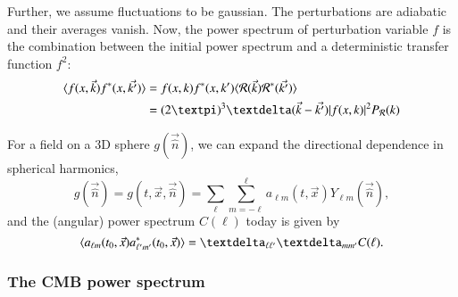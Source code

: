 Further, we assume fluctuations to be gaussian. The perturbations are adiabatic and their averages vanish. Now, the power spectrum of perturbation variable $f$ is the combination between the initial power spectrum and a deterministic transfer function $f^2$:
\begin{equation}\label{mil4:theo:eq:defining_power_spectrum}
\begin{split}
    \avg{f(x,\vec{k}) f^\ast(x,\vec{k'})} &= f(x,k)f^\ast(x,k') \avg{\mathcal{R}(\vec{k})\mathcal{R}^*(\vec{k'})} \\
    &= (2\pi)^3 \deltafunc{\vec{k}-\vec{k'}} \abs{f(x,k)}^2 P_\mathcal{R}(k)
\end{split}
\end{equation}


For a field on a 3D sphere $g(\vec{\hat{n}})$, we can expand the directional dependence in spherical harmonics,
\begin{equation}\label{mil4:theo:eq:spherical_harmonics_expansion}
    g(\vec{\hat{n}}) = g(t, \vec{x}, \vec{\hat{n}})=  \sum_{\ell} \sum_{m=-\ell}^{\ell} a_{\ell m}(t, \vec{x}) Y_{\ell m} (\vec{\hat{n}}),
\end{equation}
and the (angular) power spectrum $C(\ell)$ today is given by
\begin{equation}\label{mil4:theo:eq:defining_angular_power_spectrum}
    \avg{a\ellm(t_0, \vec{x}) a^\ast\ellmp(t_0, \vec{x})}= \deltasym{\ell \ell'} \deltasym{m m'} C(\ell).
\end{equation}



\subsubsection{The CMB power spectrum}

